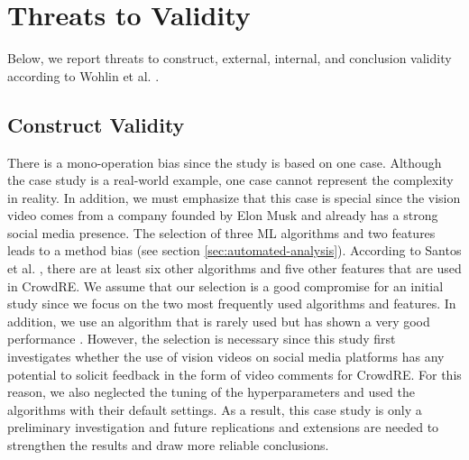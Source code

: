 \documentclass[conference]{IEEEtran}
\begin{document}
{%

\section{Threats to Validity}
\label{sec:threats-to-validity}
Below, we report threats to construct, external, internal, and conclusion validity according to Wohlin et al. \cite{Wohlin.2012}.

\subsection{Construct Validity}
There is a mono-operation bias since the study is based on one case. Although the case study is a real-world example, one case cannot represent the complexity in reality. In addition, we must emphasize that this case is special since the vision video comes from a company founded by Elon Musk and already has a strong social media presence. The selection of three ML algorithms and two features leads to a method bias (see section \ref{sec:automated-analysis}). According to Santos et al. \cite{Santos.2019a}, there are at least six other algorithms and five other features that are used in CrowdRE. We assume that our selection is a good compromise for an initial study since we focus on the two most frequently used algorithms and features. In addition, we use an algorithm that is rarely used but has shown a very good performance \cite{Santos.2019a}. However, the selection is necessary since this study first investigates whether the use of vision videos on social media platforms has any potential to solicit feedback in the form of video comments for CrowdRE. For this reason, we also neglected the tuning of the hyperparameters and used the algorithms with their default settings. As a result, this case study is only a preliminary investigation and future replications and extensions are needed to strengthen the results and draw more reliable conclusions. 

}
\end{document}
